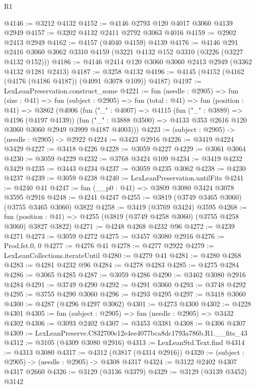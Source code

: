 \begin{lexlean}{R1}
\begin{coremodule}
@4146 := @3212 @4132
@4152 := @4146 @2793 @120 @4017 @3060 @4139 @2949
@4157 := @3202 @4132 @2411 @2792 @3063 @4016
@4159 := @2902 @2413 @2949
@4162 := @4157 (@4040 @4159) @4139
@4176 := @4146
    @291
    @2416
    @3060
    @3062
    @3310
    @4159
    (@3221 @4132 @152 @3310 (@3226 (@3227 @4132 @152)))
@4186 := @4146 @2414 @120 @3060 @3060 @2413 @2949 (@3362 @4132 @1281 @2413)
@4187 := @3258 @4132
@4196 := @4145 (@4152 (@4162 (@4176 (@4186 @4187)) (@4091 @3078 @109)) @4187)
@4197 := LexLeanPreservation.construct_some
@4221 := fun (needle : @2905) =>
  fun (size : @41) =>
  fun (subject : @2905) =>
  fun (total : @41) =>
  fun (position : @41) =>
  @3862
    (@4006
      (fun ("_" : @4007) =>
      @4115
        (fun ("_" : @3889) => @4196 (@4197 @4139))
        (fun ("_" : @3888 @3500) => @4133 @353 @2616 @120 @3060 @3060 @2949 @3999 @4187 @4003)))
@4223 := (subject : @2905) -> (needle : @2905) -> @2922
@4224 := @3423 @2916
@4226 := @3419 @4224 @3429
@4227 := @3418 @4226
@4228 := @3059 @4227
@4229 := @3061 @3064
@4230 := @3059 @4229
@4232 := @3768 @3424 @109
@4234 := @3419 @4232 @3429
@4235 := @3443 @4234
@4237 := @3059 @4235 @3062
@4238 := @4230 @4237
@4239 := @3059 @4238
@4240 := LexLeanPreservation.untilFits
@4241 := @4240 @41
@4247 := fun (__p0 : @41) => @3809 @3080 @3424 @3078 @3595 @2916
@4248 := @4241 @4247
@4255 := @3819 (@3749 @3465 @3060) (@3755 @3465 @3060) @3822
@4258 := @3419 (@3769 @3424) @3595
@4268 := fun (position : @41) => @4255 (@3819 (@3749 @4258 @3060) (@3755 @4258 @3060) @3827 @3822)
@4271 := @4248 @4268 @4232 @96
@4272 := @4239 @4271
@4273 := @3059 @4272
@4275 := @3457 @3080 @2916
@4276 := Prod.fst.{0, 0}
@4277 := @4276 @41
@4278 := @4277 @2922
@4279 := LexLeanCollections.iterateUntil
@4280 := @4279 @41
@4281 := @4280 @4268
@4283 := @4281 @4232 @96
@4284 := @4278 @4283
@4285 := @4275 @4284
@4286 := @3065 @4285
@4287 := @3059 @4286
@4290 := @3462 @3080 @2916 @4284
@4291 := @3749 @4290
@4292 := @4291 @3060
@4293 := @3748 @4292
@4295 := @3755 @4290 @3060
@4296 := @4293 @4295
@4297 := @3418 @3060
@4300 := @4287 (@4296 @4297 @3062)
@4301 := @4273 @4300
@4302 := @4228 @4301
@4305 := fun (subject : @2905) => fun (needle : @2905) => @3432 @4302
@4306 := @3093 @2402
@4307 := @3453 @3381
@4308 := @4306 @4307
@4309 := LexLeanPreserve.C832700e12e4ee4077bca8dc1793a786b.R1.__fits_43
@4312 := @3105 (@4309 @3080 @2916)
@4313 := LexLeanStd.Text.find
@4314 := @4313 @3080
@4317 := @4312 (@3817 (@4314 @2916))
@4320 := (subject : @2905) -> (needle : @2905) -> @4308 @4317
@4324 := @3122 @2402 @4307 @4317 @2660
@4326 := @3129 (@3136 @3379)
@4329 := @3129 (@3139 @3452) @3142

\end{coremodule}
\end{lexlean}
